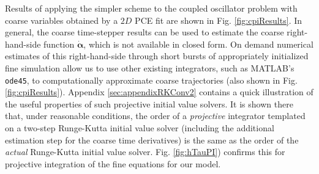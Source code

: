 \documentclass[numbers]{frontiersSCNS}
\renewcommand{\vec}[1]{\bm{#1}}
\newcommand{\figRef}[1]{Fig. \ref{fig:#1}}
\newcommand{\appendixRef}[1]{Appendix \ref{sec:#1}}
\begin{document}
Results of applying the simpler scheme
to the coupled oscillator problem
with coarse variables obtained by a $2D$ PCE fit
are shown in \figRef{cpiResults}.
%
In general, the coarse time-stepper results can be used to estimate
the coarse right-hand-side function $\dot{\vec \alpha}$,
which is not available in closed form.
%
On demand numerical estimates of this right-hand-side through
short bursts of appropriately initialized fine simulation allow us to use other existing integrators,
such as MATLAB's \texttt{ode45},
to computationally approximate coarse trajectories (also shown in \figRef{cpiResults}).
%
\appendixRef{appendixRKConv2} contains a quick illustration of the useful properties of such projective
initial value solvers.
%
It is shown there that, under reasonable conditions, the order of a \emph{projective} integrator
templated on a two-step Runge-Kutta initial value solver (including the additional estimation step for the coarse time derivatives)
is the same as the order of the
\emph{actual} Runge-Kutta initial value solver.
%
\figRef{hTauPI}) confirms this for projective
integration of the fine equations for our model.
%
%
\end{document}
